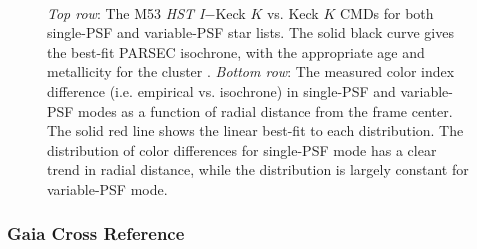 \documentclass[]{spie}  %
\begin{document}
\begin{figure}[!h]
  \centering
  \\
  \hspace{-1.2cm}
  \caption{\textit{Top row}: The M53 \textit{HST I}$-$Keck $K$ vs. Keck $K$ CMDs for both single-PSF and variable-PSF star lists. The solid black curve gives the best-fit PARSEC isochrone, with the appropriate age and metallicity for the cluster \cite{dotter:2011a,wagner:2016a}. \textit{Bottom row}: The measured color index difference (i.e. empirical vs. isochrone) in single-PSF and variable-PSF modes as a function of radial distance from the frame center. The solid red line shows the linear best-fit to each distribution. The distribution of color differences for single-PSF mode has a clear trend in radial distance, while the distribution is largely constant for variable-PSF mode.} \label{fig:m53_cmd_colorshift}
\end{figure}

\subsubsection{Gaia Cross Reference} \label{sec:m53-gaia}
\end{document}
